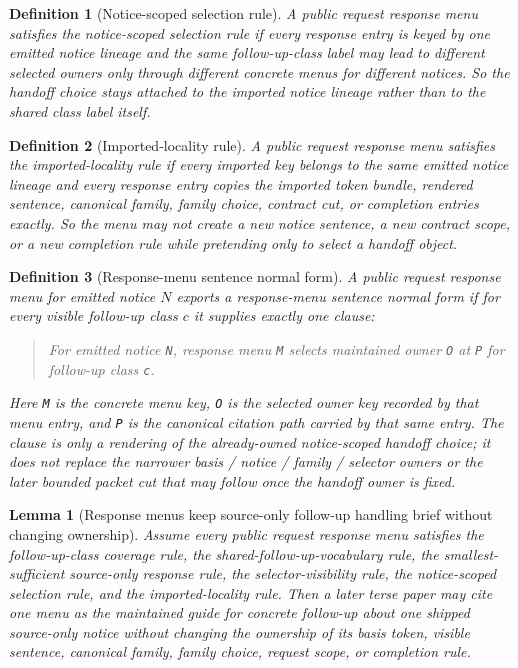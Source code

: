 \documentclass[11pt]{article}
\newtheorem{definition}{Definition}
\newtheorem{lemma}{Lemma}
\begin{document}
\begin{definition}[Notice-scoped selection rule]
A public request response menu satisfies the \emph{notice-scoped selection rule} if every response entry is keyed by one emitted notice lineage and the same follow-up-class label may lead to different selected owners only through different concrete menus for different notices.
So the handoff choice stays attached to the imported notice lineage rather than to the shared class label itself.
\end{definition}

\begin{definition}[Imported-locality rule]
A public request response menu satisfies the \emph{imported-locality rule} if every imported key belongs to the same emitted notice lineage and every response entry copies the imported token bundle, rendered sentence, canonical family, family choice, contract cut, or completion entries exactly.
So the menu may not create a new notice sentence, a new contract scope, or a new completion rule while pretending only to select a handoff object.
\end{definition}
\begin{definition}[Response-menu sentence normal form]
A public request response menu for emitted notice \(N\) exports a \emph{response-menu sentence normal form} if for every visible follow-up class \(c\) it supplies exactly one clause:
\begin{quote}\small
For emitted notice \texttt{N}, response menu \texttt{M} selects maintained owner \texttt{O} at \texttt{P} for follow-up class \texttt{c}.
\end{quote}
Here \texttt{M} is the concrete menu key, \texttt{O} is the selected owner key recorded by that menu entry, and \texttt{P} is the canonical citation path carried by that same entry. The clause is only a rendering of the already-owned notice-scoped handoff choice; it does not replace the narrower basis / notice / family / selector owners or the later bounded packet cut that may follow once the handoff owner is fixed.
\end{definition}


\begin{lemma}[Response menus keep source-only follow-up handling brief without changing ownership]
Assume every public request response menu satisfies the follow-up-class coverage rule, the shared-follow-up-vocabulary rule, the smallest-sufficient source-only response rule, the selector-visibility rule, the notice-scoped selection rule, and the imported-locality rule.
Then a later terse paper may cite one menu as the maintained guide for concrete follow-up about one shipped source-only notice without changing the ownership of its basis token, visible sentence, canonical family, family choice, request scope, or completion rule.
\end{lemma}
\end{document}
